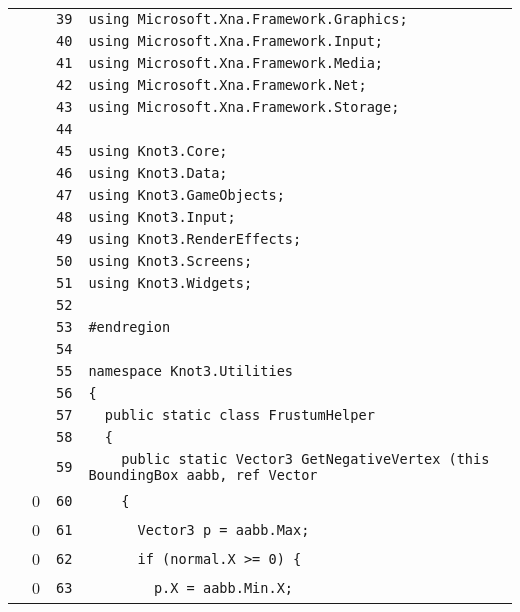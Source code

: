 \documentclass[a4paper,10pt]{article}
\begin{document}
\begin{longtable}[l]{lrrl}
\cellcolor{gray} &  & \verb~39~ & \verb~using Microsoft.Xna.Framework.Graphics;~\\
\cellcolor{gray} &  & \verb~40~ & \verb~using Microsoft.Xna.Framework.Input;~\\
\cellcolor{gray} &  & \verb~41~ & \verb~using Microsoft.Xna.Framework.Media;~\\
\cellcolor{gray} &  & \verb~42~ & \verb~using Microsoft.Xna.Framework.Net;~\\
\cellcolor{gray} &  & \verb~43~ & \verb~using Microsoft.Xna.Framework.Storage;~\\
\cellcolor{gray} &  & \verb~44~ & \verb~~\\
\cellcolor{gray} &  & \verb~45~ & \verb~using Knot3.Core;~\\
\cellcolor{gray} &  & \verb~46~ & \verb~using Knot3.Data;~\\
\cellcolor{gray} &  & \verb~47~ & \verb~using Knot3.GameObjects;~\\
\cellcolor{gray} &  & \verb~48~ & \verb~using Knot3.Input;~\\
\cellcolor{gray} &  & \verb~49~ & \verb~using Knot3.RenderEffects;~\\
\cellcolor{gray} &  & \verb~50~ & \verb~using Knot3.Screens;~\\
\cellcolor{gray} &  & \verb~51~ & \verb~using Knot3.Widgets;~\\
\cellcolor{gray} &  & \verb~52~ & \verb~~\\
\cellcolor{gray} &  & \verb~53~ & \verb~#endregion~\\
\cellcolor{gray} &  & \verb~54~ & \verb~~\\
\cellcolor{gray} &  & \verb~55~ & \verb~namespace Knot3.Utilities~\\
\cellcolor{gray} &  & \verb~56~ & \verb~{~\\
\cellcolor{gray} &  & \verb~57~ & \verb~  public static class FrustumHelper~\\
\cellcolor{gray} &  & \verb~58~ & \verb~  {~\\
\cellcolor{gray} &  & \verb~59~ & \verb~    public static Vector3 GetNegativeVertex (this BoundingBox aabb, ref Vector~\\
\cellcolor{red} & 0 & \verb~60~ & \verb~    {~\\
\cellcolor{red} & 0 & \verb~61~ & \verb~      Vector3 p = aabb.Max;~\\
\cellcolor{red} & 0 & \verb~62~ & \verb~      if (normal.X >= 0) {~\\
\cellcolor{red} & 0 & \verb~63~ & \verb~        p.X = aabb.Min.X;~\\

\end{longtable}
\end{document}
